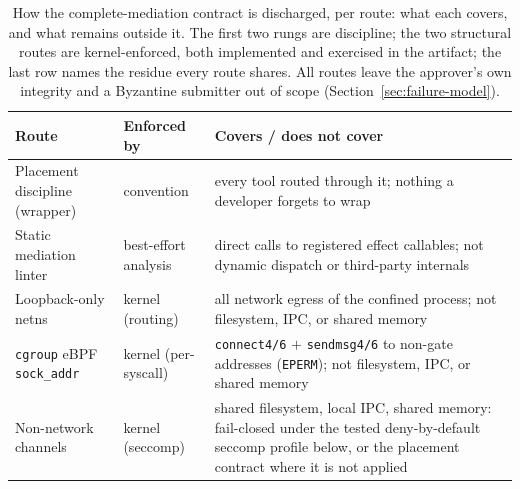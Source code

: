 \documentclass[10pt,journal,compsoc]{IEEEtran}
\begin{document}
\begin{table}[!t]
\centering
\caption{How the complete-mediation contract is discharged, per route: what
each covers, and what remains outside it. The first two rungs are
discipline; the two structural routes are kernel-enforced, both implemented
and exercised in the artifact; the last row names the residue every route
shares. All routes leave the approver's own integrity and a Byzantine
submitter out of scope (Section~\ref{sec:failure-model}).}
\label{tab:mediation}
\renewcommand{\arraystretch}{1.2}
\footnotesize
\begin{tabularx}{\columnwidth}{@{}p{2.05cm}p{1.5cm}X@{}}
\toprule
\textbf{Route} & \textbf{Enforced by} & \textbf{Covers / does not cover}\\
\midrule
Placement discipline (wrapper) & convention & every tool routed through it;
nothing a developer forgets to wrap\\
Static mediation linter & best-effort analysis & direct calls to registered
effect callables; not dynamic dispatch or third-party internals\\
Loopback-only netns & kernel (routing) & all network egress of the confined
process; not filesystem, IPC, or shared memory\\
\texttt{cgroup} eBPF \texttt{sock\_addr} & kernel (per-syscall) &
\texttt{connect4/6} $+$ \texttt{sendmsg4/6} to non-gate addresses
(\texttt{EPERM}); not filesystem, IPC, or shared memory\\
Non-network channels & kernel (seccomp) & shared filesystem, local IPC, shared
memory: fail-closed under the tested deny-by-default seccomp profile below, or
the placement contract where it is not applied\\
\bottomrule
\end{tabularx}
\end{table}
\end{document}
